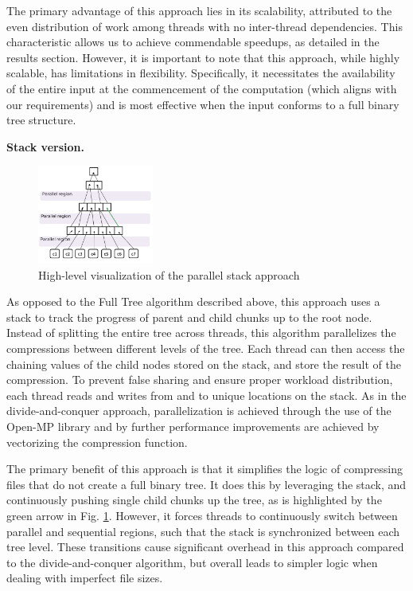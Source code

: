 \documentclass[letterpaper]{article}
\newcommand{\mypar}[1]{{\bf #1.}}
\begin{document}
The primary advantage of this approach lies in its scalability, attributed to the even distribution of work among threads with no inter-thread dependencies. This characteristic allows us to achieve commendable speedups, as detailed in the results section. However, it is important to note that this approach, while highly scalable, has limitations in flexibility. Specifically, it necessitates the availability of the entire input at the commencement of the computation (which aligns with our requirements) and is most effective when the input conforms to a full binary tree structure. 

\mypar{Stack version}
\begin{figure}[h]
	\begin{center}
		\includegraphics[width=0.34\textwidth]{figures/stack_method.png}
	\end{center}
	\caption{High-level visualization of the parallel stack approach}
 \label{fig:stack-exp}
\end{figure}

As opposed to the Full Tree algorithm described above, this approach uses a stack to track the progress of parent and child chunks up to the root node. Instead of splitting the entire tree across threads, this algorithm parallelizes the compressions between different levels of the tree. Each thread can then access the chaining values of the child nodes stored on the stack, and store the result of the compression. To prevent false sharing and ensure proper workload distribution, each thread reads and writes from and to unique locations on the stack. As in the divide-and-conquer approach, parallelization is achieved through the use of the Open-MP library and by further performance improvements are achieved by vectorizing the compression function.

The primary benefit of this approach is that it simplifies the logic of compressing files that do not create a full binary tree. It does this by leveraging the stack, and continuously pushing single child chunks up the tree, as is highlighted by the green arrow in Fig. \ref{fig:stack-exp}. However, it forces threads to continuously switch between parallel and sequential regions, such that the stack is synchronized between each tree level. These transitions cause significant overhead in this approach compared to the divide-and-conquer algorithm, but overall leads to simpler logic when dealing with imperfect file sizes.
\end{document}
